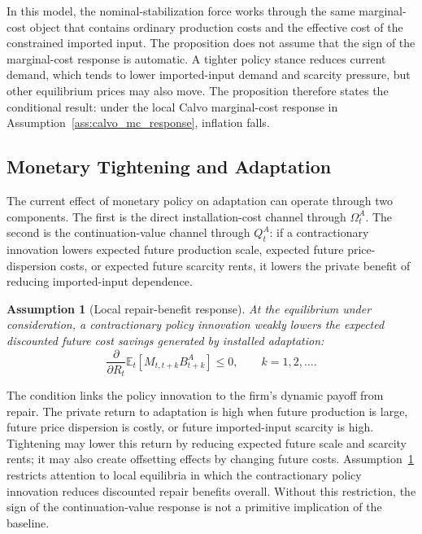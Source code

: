 ﻿\documentclass[12pt]{article}
\newtheorem{assumption}{Assumption}
\theoremstyle{remark}
\newcommand{\E}{\mathbb E}
\begin{document}
In this model, the nominal-stabilization force works through the same marginal-cost object that
contains ordinary production costs and the effective cost of the constrained imported input. The
proposition does not assume that the sign of the marginal-cost response is automatic. A tighter
policy stance reduces current demand, which tends to lower imported-input demand and scarcity
pressure, but other equilibrium prices may also move. The proposition therefore states the
conditional result: under the local Calvo marginal-cost response in
Assumption~\ref{ass:calvo_mc_response}, inflation falls.

\subsection{Monetary Tightening and Adaptation}

The current effect of monetary policy on adaptation can operate through two components. The first
is the direct installation-cost channel through $\Omega_t^A$. The second is the continuation-value
channel through $Q_t^A$: if a contractionary innovation lowers expected future production scale,
expected future price-dispersion costs, or expected future scarcity rents, it lowers the private
benefit of reducing imported-input dependence.

\begin{assumption}[Local repair-benefit response]\label{ass:Q_response}
At the equilibrium under consideration, a contractionary policy innovation weakly lowers the
expected discounted future cost savings generated by installed adaptation:
\begin{equation}
    \frac{\partial}{\partial R_t}
    \E_t
    \left[
        M_{t,t+k}B_{t+k}^A
    \right]
    \le 0,
    \qquad
    k=1,2,\ldots.
    \label{eq:future_repair_benefit_R_negative}
\end{equation}
\end{assumption}

The condition links the policy innovation to the firm's dynamic payoff from repair. The private
return to adaptation is high when future production is large, future price dispersion is costly, or
future imported-input scarcity is high. Tightening may lower this return by reducing expected
future scale and scarcity rents; it may also create offsetting effects by changing future costs.
Assumption~\ref{ass:Q_response} restricts attention to local equilibria in which the contractionary
policy innovation reduces discounted repair benefits overall. Without this restriction, the sign of
the continuation-value response is not a primitive implication of the baseline.
\end{document}
